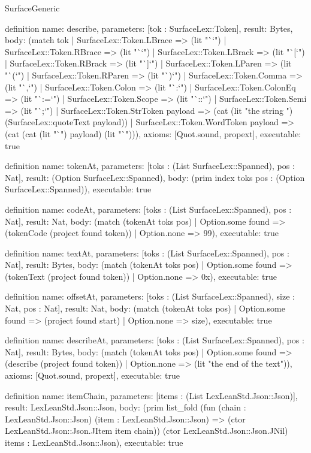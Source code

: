 \begin{lexlean}{SurfaceGeneric}
\begin{semanticmodule}
definition{
  name: describe,
  parameters: [tok : SurfaceLex::Token],
  result: Bytes,
  body: (match tok
    | SurfaceLex::Token.LBrace => (lit "`{`")
    | SurfaceLex::Token.RBrace => (lit "`}`")
    | SurfaceLex::Token.LBrack => (lit "`[`")
    | SurfaceLex::Token.RBrack => (lit "`]`")
    | SurfaceLex::Token.LParen => (lit "`(`")
    | SurfaceLex::Token.RParen => (lit "`)`")
    | SurfaceLex::Token.Comma => (lit "`,`")
    | SurfaceLex::Token.Colon => (lit "`:`")
    | SurfaceLex::Token.ColonEq => (lit "`:=`")
    | SurfaceLex::Token.Scope => (lit "`::`")
    | SurfaceLex::Token.Semi => (lit "`;`")
    | SurfaceLex::Token.StrToken payload => (cat (lit "the string ") (SurfaceLex::quoteText payload))
    | SurfaceLex::Token.WordToken payload => (cat (cat (lit "`") payload) (lit "`"))),
  axioms: [Quot.sound, propext],
  executable: true
}

definition{
  name: tokenAt,
  parameters: [toks : (List SurfaceLex::Spanned), pos : Nat],
  result: (Option SurfaceLex::Spanned),
  body: (prim index toks pos : (Option SurfaceLex::Spanned)),
  executable: true
}

definition{
  name: codeAt,
  parameters: [toks : (List SurfaceLex::Spanned), pos : Nat],
  result: Nat,
  body: (match (tokenAt toks pos)
    | Option.some found => (tokenCode (project found token))
    | Option.none => 99),
  executable: true
}

definition{
  name: textAt,
  parameters: [toks : (List SurfaceLex::Spanned), pos : Nat],
  result: Bytes,
  body: (match (tokenAt toks pos)
    | Option.some found => (tokenText (project found token))
    | Option.none => 0x),
  executable: true
}

definition{
  name: offsetAt,
  parameters: [toks : (List SurfaceLex::Spanned), size : Nat, pos : Nat],
  result: Nat,
  body: (match (tokenAt toks pos)
    | Option.some found => (project found start)
    | Option.none => size),
  executable: true
}

definition{
  name: describeAt,
  parameters: [toks : (List SurfaceLex::Spanned), pos : Nat],
  result: Bytes,
  body: (match (tokenAt toks pos)
    | Option.some found => (describe (project found token))
    | Option.none => (lit "the end of the text")),
  axioms: [Quot.sound, propext],
  executable: true
}

definition{
  name: itemChain,
  parameters: [items : (List LexLeanStd.Json::Json)],
  result: LexLeanStd.Json::Json,
  body: (prim list_fold (fun (chain : LexLeanStd.Json::Json) (item : LexLeanStd.Json::Json) => (ctor LexLeanStd.Json::Json.JItem item chain)) (ctor LexLeanStd.Json::Json.JNil) items : LexLeanStd.Json::Json),
  executable: true
}


\end{semanticmodule}
\end{lexlean}
